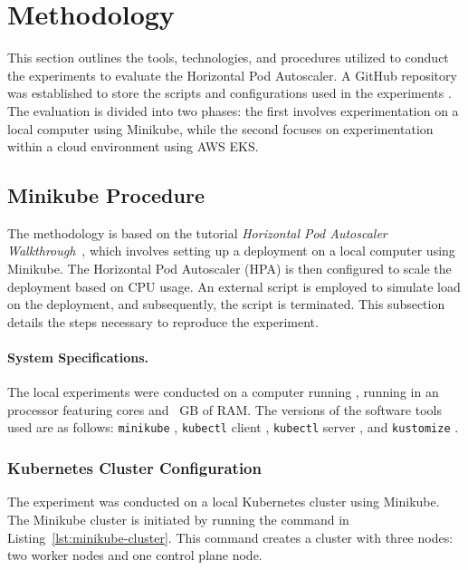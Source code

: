 \section{Methodology}

This section outlines the tools, technologies, and procedures utilized to conduct the experiments to evaluate the Horizontal Pod Autoscaler.
A GitHub repository was established to store the scripts and configurations used in the experiments \githubLink{}.
The evaluation is divided into two phases: the first involves experimentation on a local computer using Minikube, while the second focuses on experimentation within a cloud environment using AWS EKS.

\subsection{Minikube Procedure}

The methodology is based on the tutorial \textit{Horizontal Pod Autoscaler Walkthrough}~\cite{KubernetesHpaWalkthrough}, which involves setting up a deployment on a local computer using Minikube. The Horizontal Pod Autoscaler (HPA) is then configured to scale the deployment based on CPU usage. An external script is employed to simulate load on the deployment, and subsequently, the script is terminated. This subsection details the steps necessary to reproduce the experiment.

\paragraph{System Specifications.} The local experiments were conducted on a computer running \operatingSystem{}, running in an \cpuModel{} processor featuring \cpuCores{} cores and \cpuRam{}~GB of RAM. The versions of the software tools used are as follows: \texttt{minikube} \minikubeVersion{}, \texttt{kubectl} client \kubectlClientVersion{}, \texttt{kubectl} server \kubectlServerVersion{}, and \texttt{kustomize} \kubectlKustomizeVersion{}.

\subsubsection{Kubernetes Cluster Configuration}

The experiment was conducted on a local Kubernetes cluster using Minikube. The Minikube cluster is initiated by running the command in Listing~\ref{lst:minikube-cluster}. This command creates a cluster with three nodes: two worker nodes and one control plane node.


